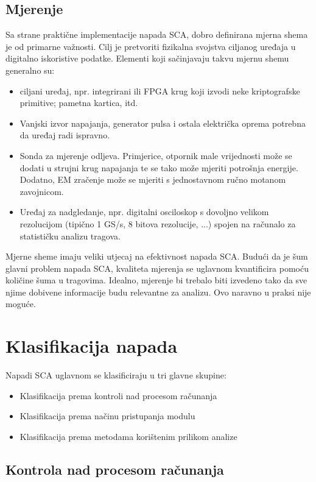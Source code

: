 \documentclass[times, utf8, diplomski]{fer}
\begin{document}
\subsection{Mjerenje}
Sa strane praktične implementacije napada SCA, dobro definirana mjerna shema je od primarne važnosti. Cilj je pretvoriti fizikalna svojstva ciljanog uređaja u digitalno iskoristive podatke. Elementi koji sačinjavaju takvu mjernu shemu generalno su:
\begin{itemize}
    \item ciljani uređaj, npr. integrirani ili FPGA krug koji izvodi neke kriptografske primitive; pametna kartica, itd.
    \item Vanjski izvor napajanja, generator pulsa i ostala električka oprema potrebna da uređaj radi ispravno.
    \item Sonda za mjerenje odljeva. Primjerice, otpornik male vrijednosti može se dodati u strujni krug napajanja te se tako može mjeriti potrošnja energije. Dodatno, EM zračenje može se mjeriti s jednostavnom ručno motanom zavojnicom.
    \item Uređaj za nadgledanje, npr. digitalni osciloskop s dovoljno velikom rezolucijom (tipično 1 GS/s, 8 bitova rezolucije, ...) spojen na računalo za statističku analizu tragova.
\end{itemize}

Mjerne sheme imaju veliki utjecaj na efektivnost napada SCA. Budući da je šum glavni problem napada SCA, kvaliteta mjerenja se uglavnom kvantificira pomoću količine šuma u tragovima. Idealno, mjerenje bi trebalo biti izvedeno tako da sve njime dobivene informacije budu relevantne za analizu. Ovo naravno u praksi nije moguće.

\section{Klasifikacija napada} \label{sec:attacks}

Napadi SCA uglavnom se klasificiraju u tri glavne skupine:

\begin{itemize}
    \item Klasifikacija prema kontroli nad procesom računanja
    \item Klasifikacija prema načinu pristupanja modulu
    \item Klasifikacija prema metodama korištenim prilikom analize
\end{itemize}

\subsection{Kontrola nad procesom računanja}
\end{document}
